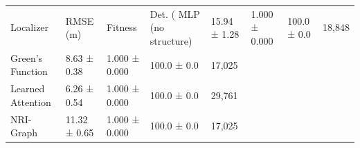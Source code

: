 \begin{tabular}{lllll}
\toprule
Localizer & RMSE (m) & Fitness & Det. (%
\midrule
MLP (no structure) & 15.94 ± 1.28 & 1.000 ± 0.000 & 100.0 ± 0.0 & 18,848 \\
Green's Function & 8.63 ± 0.38 & 1.000 ± 0.000 & 100.0 ± 0.0 & 17,025 \\
Learned Attention & 6.26 ± 0.54 & 1.000 ± 0.000 & 100.0 ± 0.0 & 29,761 \\
NRI-Graph & 11.32 ± 0.65 & 1.000 ± 0.000 & 100.0 ± 0.0 & 17,025 \\
\bottomrule
\end{tabular}
